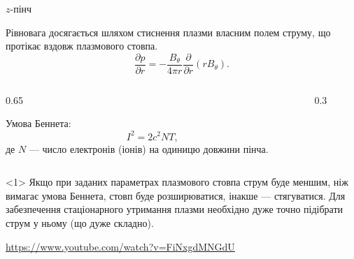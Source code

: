 \documentclass[]{beamer}
\begin{document}
\begin{frame}{$z$-пінч}{}
	\begin{block}{}\justifying
		Рівновага досягається шляхом стиснення плазми власним полем струму, що протікає вздовж плазмового стовпа.
		\begin{equation*}
			\frac{\partial p}{\partial r} = -\frac{B_{\theta}}{4\pi r}  \frac{\partial }{\partial r}(r B_{\theta}).
		\end{equation*}
	\end{block}
	\begin{columns}
		\begin{column}{0.65\linewidth}
			\begin{block}{}\justifying
				Умова Беннета:
				\begin{equation*}
					I^2 = 2c^2 N T,
				\end{equation*}
				де $N$ --- число електронів (іонів) на одиницю довжини пінча.
			\end{block}
		\end{column}
		\begin{column}{0.3\linewidth}
			\begin{center}
				
			\end{center}
		\end{column}
	\end{columns}
	\begin{block}{}<1>\justifying\scriptsize
		Якщо при заданих параметрах плазмового стовпа струм буде меншим, ніж вимагає умова
		Беннета, стовп буде розширюватися, інакше --- стягуватися. Для забезпечення стаціонарного
		утримання плазми необхідно дуже точно підібрати струм у ньому (що дуже складно).
	\end{block}
\url{https://www.youtube.com/watch?v=FiNxgdMNGdU}
\end{frame}
\end{document}
